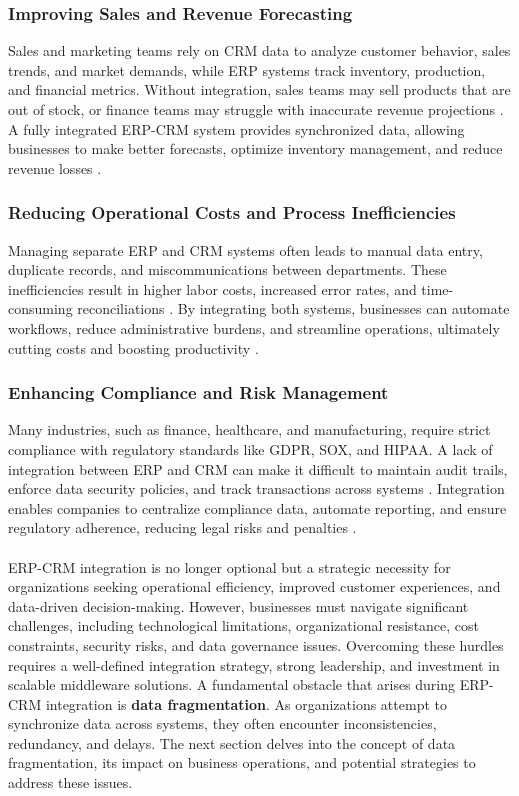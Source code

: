 \subsubsection{Improving Sales and Revenue Forecasting}
Sales and marketing teams rely on CRM data to analyze customer behavior, sales trends, and market demands, while ERP systems track inventory, production, and financial metrics. Without integration, sales teams may sell products that are out of stock, or finance teams may struggle with inaccurate revenue projections \cite{ruivo2014}. A fully integrated ERP-CRM system provides synchronized data, allowing businesses to make better forecasts, optimize inventory management, and reduce revenue losses \cite{shaul2013}.

\subsubsection{Reducing Operational Costs and Process Inefficiencies}
Managing separate ERP and CRM systems often leads to manual data entry, duplicate records, and miscommunications between departments. These inefficiencies result in higher labor costs, increased error rates, and time-consuming reconciliations \cite{hendricks2007}. By integrating both systems, businesses can automate workflows, reduce administrative burdens, and streamline operations, ultimately cutting costs and boosting productivity \cite{gebreyes2018}.

\subsubsection{Enhancing Compliance and Risk Management}
Many industries, such as finance, healthcare, and manufacturing, require strict compliance with regulatory standards like GDPR, SOX, and HIPAA. A lack of integration between ERP and CRM can make it difficult to maintain audit trails, enforce data security policies, and track transactions across systems \cite{devarashetty2023}. Integration enables companies to centralize compliance data, automate reporting, and ensure regulatory adherence, reducing legal risks and penalties \cite{ruivo2014}.

\paragraph{}
ERP-CRM integration is no longer optional but a strategic necessity for organizations seeking operational efficiency, improved customer experiences, and data-driven decision-making. However, businesses must navigate significant challenges, including technological limitations, organizational resistance, cost constraints, security risks, and data governance issues. Overcoming these hurdles requires a well-defined integration strategy, strong leadership, and investment in scalable middleware solutions. A fundamental obstacle that arises during ERP-CRM integration is \textbf{data fragmentation}. As organizations attempt to synchronize data across systems, they often encounter inconsistencies, redundancy, and delays. The next section delves into the concept of data fragmentation, its impact on business operations, and potential strategies to address these issues.

